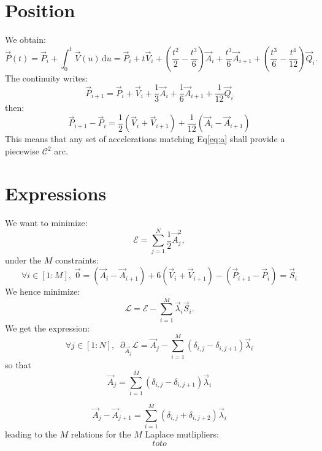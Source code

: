\documentclass[aps,12pt]{revtex4}
\begin{document}
\section{Position}
We obtain:
\begin{equation}
	\vec{P}(t) = \vec{P}_{i} + \int_0^t \vec{V}(u)  \,\mathrm{d}u = 
	\vec{P}_i + t \vec{V}_i + \left(\frac{t^2}{2}-\frac{t^3}{6}\right) \vec{A}_{i} 
	+ \frac{t^3}{6} \vec{A}_{i+1}
	+ \left(\frac{t^3}{6} - \frac{t^4}{12}\right) \vec{Q}_i.
\end{equation}
The continuity writes:
\begin{equation}
	\vec{P}_{i+1} = \vec{P}_{i} + \vec{V}_i + \frac{1}{3} \vec{A}_i + \frac{1}{6} \vec{A}_{i+1} + \frac{1}{12} \vec{Q}_i
\end{equation}
then:
\begin{equation}
\label{eq:a}
\boxed{
	\vec{P}_{i+1} - \vec{P}_{i} = \frac{1}{2} \left( \vec{V}_i + \vec{V}_{i+1} \right)
	+\frac{1}{12}\left(\vec{A}_{i}-\vec{A}_{i+1}\right)
	}
\end{equation}
This means that  any set of accelerations matching Eq\eqref{eq:a} shall provide a piecewise $\mathcal{C}^2$ arc.
\section{Expressions}
We want to minimize:
\begin{equation}
	\mathcal{E} = \sum_{j=1}^{N} \frac{1}{2} \vec{A}_j^2,
\end{equation}
under the $M$ constraints:
\begin{equation}
	\forall i \in [1:M], \; \vec{0} = \left(\vec{A}_{i}-\vec{A}_{i+1}\right) + 6 \left( \vec{V}_i + \vec{V}_{i+1} \right ) - \left( \vec{P}_{i+1} - \vec{P}_{i} \right) = \vec{S}_i
\end{equation}
We hence minimize:
\begin{equation}
	\mathcal{L} = \mathcal{E} - \sum_{i=1}^M \vec{\lambda}_i \vec{S}_i.
\end{equation}
We get the expression:
\begin{equation}
	\forall j \in [1:N],\;\; \partial_{\vec{A}_j} \mathcal{L} = \vec{A}_j 
	- \sum_{i=1}^M \left( \delta_{i,j} - \delta_{i,j+1}\right)\vec{\lambda}_i
\end{equation}
so that
\begin{equation}
	\vec{A}_j =  \sum_{i=1}^M \left( \delta_{i,j} - \delta_{i,j+1}\right)\vec{\lambda}_i
\end{equation}

\begin{equation}
	\vec{A}_j - \vec{A}_{j+1} =  \sum_{i=1}^M \left( \delta_{i,j} + \delta_{i,j+2}\right)\vec{\lambda}_i
\end{equation}
leading to the $M$ relations for the $M$ Laplace mutlipliers:
\begin{equation}
	toto
\end{equation}
\end{document}
